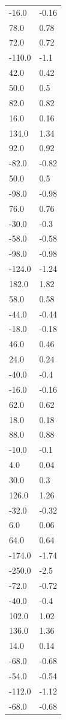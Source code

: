 \begin{longtable}{ll}
-16.0 & -0.16 \\
78.0 & 0.78 \\
72.0 & 0.72 \\
-110.0 & -1.1 \\
42.0 & 0.42 \\
50.0 & 0.5 \\
82.0 & 0.82 \\
16.0 & 0.16 \\
134.0 & 1.34 \\
92.0 & 0.92 \\
-82.0 & -0.82 \\
50.0 & 0.5 \\
-98.0 & -0.98 \\
76.0 & 0.76 \\
-30.0 & -0.3 \\
-58.0 & -0.58 \\
-98.0 & -0.98 \\
-124.0 & -1.24 \\
182.0 & 1.82 \\
58.0 & 0.58 \\
-44.0 & -0.44 \\
-18.0 & -0.18 \\
46.0 & 0.46 \\
24.0 & 0.24 \\
-40.0 & -0.4 \\
-16.0 & -0.16 \\
62.0 & 0.62 \\
18.0 & 0.18 \\
88.0 & 0.88 \\
-10.0 & -0.1 \\
4.0 & 0.04 \\
30.0 & 0.3 \\
126.0 & 1.26 \\
-32.0 & -0.32 \\
6.0 & 0.06 \\
64.0 & 0.64 \\
-174.0 & -1.74 \\
-250.0 & -2.5 \\
-72.0 & -0.72 \\
-40.0 & -0.4 \\
102.0 & 1.02 \\
136.0 & 1.36 \\
14.0 & 0.14 \\
-68.0 & -0.68 \\
-54.0 & -0.54 \\
-112.0 & -1.12 \\
-68.0 & -0.68 \\

\end{longtable}
